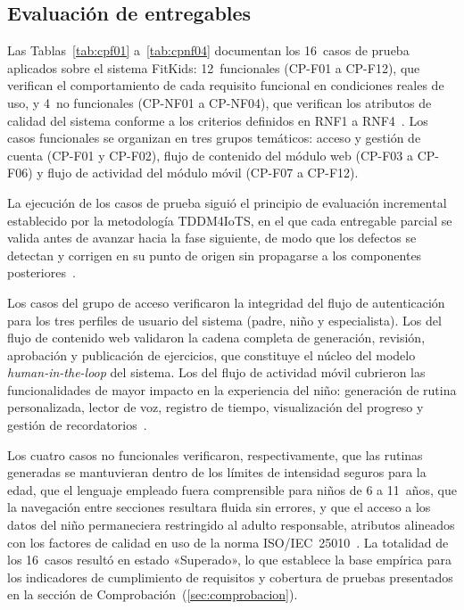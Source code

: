 			\subsection{Evaluación de entregables}
			\label{delEval}
				Las Tablas~\ref{tab:cpf01} a~\ref{tab:cpnf04} documentan los 16~casos de prueba aplicados sobre el sistema FitKids: 12~funcionales (CP-F01 a CP-F12), que verifican el comportamiento de cada requisito funcional en condiciones reales de uso, y 4~no funcionales (CP-NF01 a CP-NF04), que verifican los atributos de calidad del sistema conforme a los criterios definidos en RNF1 a RNF4~\cite{GuerreroUlloa2024}. Los casos funcionales se organizan en tres grupos temáticos: acceso y gestión de cuenta (CP-F01 y CP-F02), flujo de contenido del módulo web (CP-F03 a CP-F06) y flujo de actividad del módulo móvil (CP-F07 a CP-F12).
				
				La ejecución de los casos de prueba siguió el principio de evaluación incremental establecido por la metodología TDDM4IoTS, en el que cada entregable parcial se valida antes de avanzar hacia la fase siguiente, de modo que los defectos se detectan y corrigen en su punto de origen sin propagarse a los componentes posteriores~\cite{GuerreroUlloa2024,Pressman2019}.
				
				Los casos del grupo de acceso verificaron la integridad del flujo de autenticación para los tres perfiles de usuario del sistema (padre, niño y especialista). Los del flujo de contenido web validaron la cadena completa de generación, revisión, aprobación y publicación de ejercicios, que constituye el núcleo del modelo \textit{human-in-the-loop} del sistema. Los del flujo de actividad móvil cubrieron las funcionalidades de mayor impacto en la experiencia del niño: generación de rutina personalizada, lector de voz, registro de tiempo, visualización del progreso y gestión de recordatorios~\cite{GuerreroUlloa2024}.
				
				Los cuatro casos no funcionales verificaron, respectivamente, que las rutinas generadas se mantuvieran dentro de los límites de intensidad seguros para la edad, que el lenguaje empleado fuera comprensible para niños de 6 a 11~años, que la navegación entre secciones resultara fluida sin errores, y que el acceso a los datos del niño permaneciera restringido al adulto responsable, atributos alineados con los factores de calidad en uso de la norma ISO/IEC~25010~\cite{GuerreroUlloa2024}. La totalidad de los 16~casos resultó en estado «Superado», lo que establece la base empírica para los indicadores de cumplimiento de requisitos y cobertura de pruebas presentados en la sección de Comprobación~(\ref{sec:comprobacion}).
				
